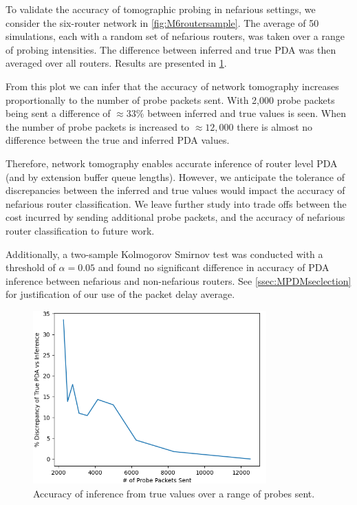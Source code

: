 To validate the accuracy of tomographic probing in nefarious settings, we consider the six-router network in \cref{fig:M6routersample}. The average of 50 simulations, each with a random set of nefarious routers, was taken over a range of probing intensities. The difference between inferred and true PDA was then averaged over all routers. Results are presented in \cref{fig:MPDAvarprobing}.\par
From this plot we can infer that the accuracy of network tomography increases proportionally to the number of probe packets sent. With 2,000 probe packets being sent a difference of $\approx 33\%$ between inferred and true values is seen. When the number of probe packets is increased to $\approx 12,000$ there is almost no difference between the true and inferred PDA values.\par
Therefore, network tomography enables accurate inference of router level PDA (and by extension buffer queue lengths). However, we anticipate the tolerance of discrepancies between the inferred and true values would impact the accuracy of nefarious router classification. We leave further study into trade offs between the cost incurred by sending additional probe packets, and the accuracy of nefarious router classification to future work.\par
Additionally, a two-sample Kolmogorov Smirnov test was conducted with a threshold of $\alpha=0.05$ and found no significant difference in accuracy of PDA inference between nefarious and non-nefarious routers. See \cref{ssec:MPDMseclection} for justification of our use of the packet delay average.
\begin{figure}[H]
    \centering
    \includegraphics[width=0.8\textwidth]{figs/results/Probe_PDV_accuracy_plot.png}
    \caption{Accuracy of inference from true values over a range of probes sent.}
    \label{fig:MPDAvarprobing}
\end{figure}


